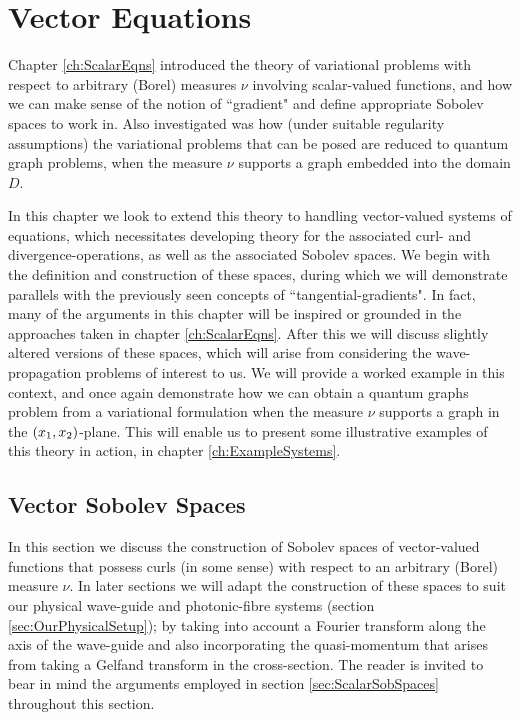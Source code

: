 \chapter{Vector Equations} \label{ch:VectorEqns}
Chapter \ref{ch:ScalarEqns} introduced the theory of variational problems with respect to arbitrary (Borel) measures $\nu$ involving scalar-valued functions, and how we can make sense of the notion of ``gradient" and define appropriate Sobolev spaces to work in.
Also investigated was how (under suitable regularity assumptions) the variational problems that can be posed are reduced to quantum graph problems, when the measure $\nu$ supports a graph embedded into the domain $D$. \newline

In this chapter we look to extend this theory to handling vector-valued systems of equations, which necessitates developing theory for the associated curl- and divergence-operations, as well as the associated Sobolev spaces.
We begin with the definition and construction of these spaces, during which we will demonstrate parallels with the previously seen concepts of ``tangential-gradients".
In fact, many of the arguments in this chapter will be inspired or grounded in the approaches taken in chapter \ref{ch:ScalarEqns}.
After this we will discuss slightly altered versions of these spaces, which will arise from considering the wave-propagation problems of interest to us.
We will provide a worked example in this context, and once again demonstrate how we can obtain a quantum graphs problem from a variational formulation when the measure $\nu$ supports a graph in the $\left( x_1,x_2 \right)$-plane.
This will enable us to present some illustrative examples of this theory in action, in chapter \ref{ch:ExampleSystems}.

\section{Vector Sobolev Spaces} \label{sec:VectorSobSpaces}
In this section we discuss the construction of Sobolev spaces of vector-valued functions that possess curls (in some sense) with respect to an arbitrary (Borel) measure $\nu$.
In later sections we will adapt the construction of these spaces to suit our physical wave-guide and photonic-fibre systems (section \ref{sec:OurPhysicalSetup}); by taking into account a Fourier transform along the axis of the wave-guide and also incorporating the quasi-momentum that arises from taking a Gelfand transform in the cross-section.
The reader is invited to bear in mind the arguments employed in section \ref{sec:ScalarSobSpaces} throughout this section. \newline

